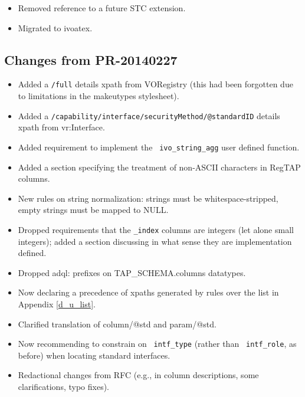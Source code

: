 \documentclass[11pt,a4paper]{ivoa}
\newcommand{\rtent}[1]{\texttt{\color{rtcolor} #1}}
\begin{document}
\begin{itemize}
\item Removed reference to a future STC extension.
\item Migrated to ivoatex.
\end{itemize}

\subsection{Changes from PR-20140227}

\label{changes-20140227}

\begin{itemize}

\item Added a \texttt{/full} details xpath from VORegistry (this had
  been forgotten due to limitations in the makeutypes stylesheet).{}

\item Added a \texttt{/capability/interface/securityMethod/@standardID}
  details xpath from vr:Interface.{}

\item Added requirement to implement the \rtent{ivo\_string\_agg}
  user defined function.{}

\item Added a section specifying the treatment of non-ASCII characters
  in RegTAP columns.{}

\item New rules on string normalization: strings must be
  whitespace-stripped, empty strings must be mapped to NULL.{}

\item Dropped requirements that the \texttt{\_index} columns are
  integers (let alone small integers); added a section discussing in
  what sense they are implementation defined.{}

\item Dropped adql: prefixes on TAP\_SCHEMA.columns datatypes.{}

\item Now declaring a precedence of xpaths generated by rules over the
  list in Appendix \ref{d_u_list}.{}

\item Clarified translation of column/@std and param/@std.{}

\item Now recommending to constrain on \rtent{intf\_type}
  (rather than \rtent{intf\_role}, as before) when locating standard
  interfaces.{}

\item Redactional changes from RFC (e.g., in column descriptions, some 
  clarifications, typo fixes).{}


\end{itemize}
\end{document}
